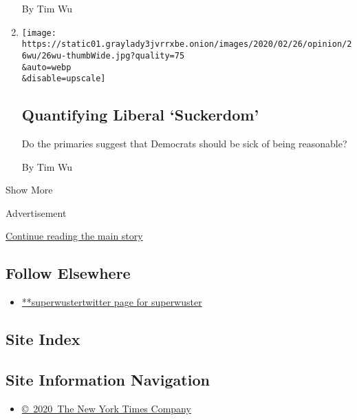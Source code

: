 \begin{enumerate}
  By Tim Wu
\item
  \href{/2020/02/26/opinion/democrats-sanders-appeal.html}{}

  \texttt{[image: https://static01.graylady3jvrrxbe.onion/images/2020/02/26/opinion/26wu/26wu-thumbWide.jpg?quality=75\\\&auto=webp\\\&disable=upscale]}

  \hypertarget{quantifying-liberal-suckerdom}{%
  \subsection{Quantifying Liberal
  `Suckerdom'}\label{quantifying-liberal-suckerdom}}

  Do the primaries suggest that Democrats should be sick of being
  reasonable?

  By Tim Wu
\end{enumerate}

Show More

Advertisement

\protect\hyperlink{after-mid2}{Continue reading the main story}

\hypertarget{follow-elsewhere}{%
\subsection{Follow Elsewhere}\label{follow-elsewhere}}

\begin{itemize}
\tightlist
\item
  \href{https://twitter.com/superwuster}{**superwustertwitter page for
  superwuster}
\end{itemize}

\hypertarget{site-index}{%
\subsection{Site Index}\label{site-index}}

\hypertarget{site-information-navigation}{%
\subsection{Site Information
Navigation}\label{site-information-navigation}}

\begin{itemize}
\tightlist
\item
  \href{https://help.nytimes3xbfgragh.onion/hc/en-us/articles/115014792127-Copyright-notice}{©~2020~The
  New York Times Company}
\end{itemize}

